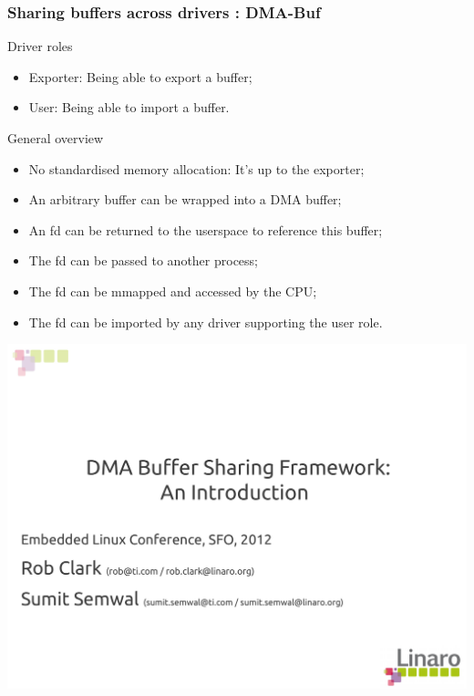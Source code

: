 \documentclass[11pt,english,compress]{beamer}
\begin{document}
\begin{frame}
	\frametitle{Sharing buffers across drivers : DMA-Buf}

	\begin{block}{Driver roles}
		\begin{itemize}
			\item Exporter: Being able to export a buffer;
			\item User: Being able to import a buffer.
		\end{itemize}
	\end{block}

	\begin{block}{General overview}
		\begin{itemize}
			\item No standardised memory allocation: It's up to the exporter;
			\item An arbitrary buffer can be wrapped into a DMA buffer;
			\item An fd can be returned to the userspace to reference this buffer;
			\item The fd can be passed to another process;
			\item The fd can be mmapped and accessed by the CPU;
			\item The fd can be imported by any driver supporting the user role.
		\end{itemize}
	\end{block}
\end{frame}

\begin{frame}
	\includegraphics[page=13,width=\linewidth]{DMA_Buffer_Sharing-_An_Introduction.pdf}
\end{frame}
\end{document}
